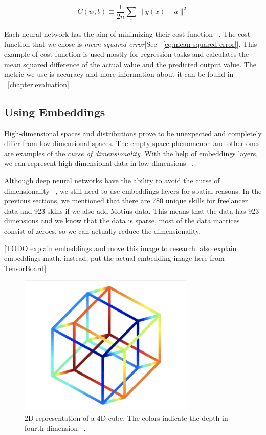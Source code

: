 \begin{equation}
C(w, b) \equiv \frac{1}{2 n} \sum_{x}\|y(x)-a\|^{2}
\label{eq:mean-squared-error}
\end{equation}

Each neural network has the aim of minimizing their cost function ~\parencite{Goodfellow-et-al-2016}. The cost function that we chose is \textit{mean squared error}[See ~\autoref{eq:mean-squared-error}]. This example of cost function is used mostly for regression tasks and calculates the mean squared difference of the actual value and the predicted output value. The metric we use is accuracy and more information about it can be found in ~\autoref{chapter:evaluation}.


\subsection{Using Embeddings}\label{subsection:using-embeddings}

High-dimensional spaces and distributions  prove to be unexpected and completely differ from low-dimensional spaces. The empty space phenomenon and other ones are examples of the \textit{curse of dimensionality}. With the help of embeddings layers, we can represent high-dimensional data in low-dimensions  ~\parencite{lee2007nonlinear}.

Although deep neural networks have the ability to avoid the  curse of dimensionality ~\parencite{poggio2017and}, we still need to use embeddings layers for spatial reasons. In the previous sections, we mentioned that there are 780 unique skills for freelancer data and 923 skills if we also add Motius data. This means that the data has 923 dimensions and we know that the data is sparse, most of the data matrices consist of zeroes, so we can actually reduce the dimensionality. 

[TODO explain embeddings and move this image to research. also explain embeddings math. instead, put the actual embedding image here from TensorBoard]
 \begin{figure}[h]
	\centering
	\includegraphics[width=0.75\textwidth]{figures/DimensionalityReduction.png}
	\caption{2D representation of a 4D cube. The colors indicate the depth in fourth dimension ~\parencite{lee2007nonlinear}.}
	\label{fig:embedding-projection}
\end{figure}


